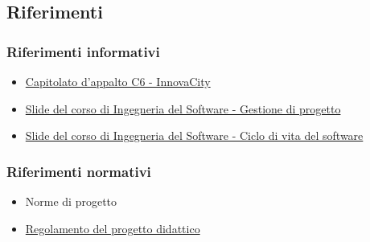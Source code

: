\subsection{Riferimenti}
\subsubsection{Riferimenti informativi}
    \begin{itemize}
        \item \href {https://www.math.unipd.it/~tullio/IS-1/2023/Progetto/C6.pdf} {Capitolato d'appalto C6 - InnovaCity }
        \item \href{https://www.math.unipd.it/~tullio/IS-1/2023/Dispense/T4.pdf} {Slide del corso di Ingegneria del Software - Gestione di progetto }
        \item \href{https://www.math.unipd.it/~tullio/IS-1/2023/Dispense/T2.pdf} {Slide del corso di Ingegneria del Software - Ciclo di vita del software }
    \end{itemize}
 
\subsubsection{Riferimenti normativi}
    \begin{itemize}
    \item Norme di progetto
    \item \href {https://www.math.unipd.it/~tullio/IS-1/2023/Dispense/PD2.pdf} {Regolamento del progetto didattico }
    \end{itemize}

\vspace{0.5cm}